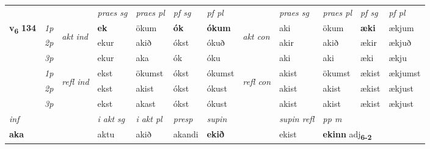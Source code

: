 \begin{longtable}[l]{X>{\footnotesize\itshape}llXXXXlXXXX}
 & &   & \textit{praes sg}  & \textit{praes pl}    & \textit{ pf sg} & \textit{pf pl} & & \textit{praes sg}  & \textit{praes pl}    & \textit{pf sg} & \textit{pf pl }  \\ \cmidrule{4-7} \cmidrule{9-12}
 \multirow{2}{*}{{{\textbf{v{\textsubscript{6}}} \Large{\textbf{134}}}}}  & 1p & \multirow{3}{*}{\begin{turn}{90}\textit{akt ind}\end{turn}} & \textbf{ek} & ökum & \textbf{ók} & \textbf{ókum} & \multirow{3}{*}{\begin{turn}{90}\textit{akt con}\end{turn}} &aki & ökum & \textbf{æki} & ækjum\\*
 & 2p &  &  ekur  & akið & ókst & ókuð & & akir & akið & ækir & ækjuð \\*
 & 3p &  & ekur & aka & ók & óku & & aki & aki& æki & ækju \\*
\cmidrule{4-7} \cmidrule{9-12}
 & 1p & \multirow{3}{*}{\begin{turn}{90}\textit{refl ind}\end{turn}}  & ekst & ökumst & ókst & ókumst & \multirow{3}{*}{\begin{turn}{90}\textit{refl con}\end{turn}}  &akist & ökumst & ækist & ækjumst \\*
 & 2p &  & ekst & akist & ókst & ókust & &akist & akist & ækist & ækjust \\*
 & 3p  & & ekst & akast & ókst & ókust & & akist & akist& ækist & ækjust \\*
\cmidrule{4-7} \cmidrule{9-12}

   {\textit{inf}} & &  & \textit{i akt sg} & \textit{i akt pl}   & \textit{presp} & \textit{supin} && \textit{supin refl} & \textit{pp m} \\*
  {\textbf{aka}} & && aktu  & akið   & akandi &  \textbf{ekið} && ekist & \multicolumn{2}{l}{\textbf{ekinn} adj\textbf{\textsubscript{6-2}}} \\*

\midrule


\end{longtable}
